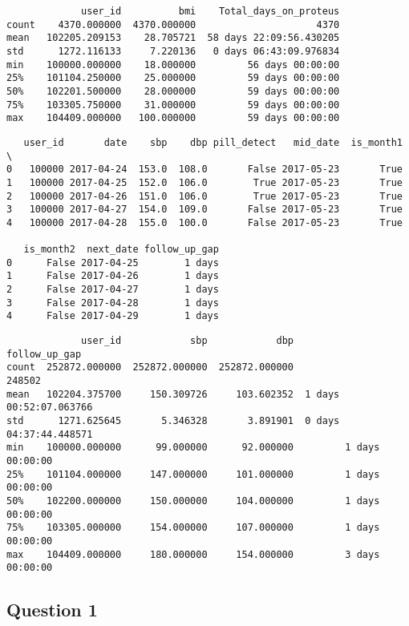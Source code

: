 \documentclass[11pt]{article}
\begin{document}
    
    
    \begin{verbatim}
             user_id          bmi    Total_days_on_proteus
count    4370.000000  4370.000000                     4370
mean   102205.209153    28.705721  58 days 22:09:56.430205
std      1272.116133     7.220136   0 days 06:43:09.976834
min    100000.000000    18.000000         56 days 00:00:00
25%    101104.250000    25.000000         59 days 00:00:00
50%    102201.500000    28.000000         59 days 00:00:00
75%    103305.750000    31.000000         59 days 00:00:00
max    104409.000000   100.000000         59 days 00:00:00
    \end{verbatim}

    
    
    \begin{verbatim}
   user_id       date    sbp    dbp pill_detect   mid_date  is_month1  \
0   100000 2017-04-24  153.0  108.0       False 2017-05-23       True   
1   100000 2017-04-25  152.0  106.0        True 2017-05-23       True   
2   100000 2017-04-26  151.0  106.0        True 2017-05-23       True   
3   100000 2017-04-27  154.0  109.0       False 2017-05-23       True   
4   100000 2017-04-28  155.0  100.0       False 2017-05-23       True   

   is_month2  next_date follow_up_gap  
0      False 2017-04-25        1 days  
1      False 2017-04-26        1 days  
2      False 2017-04-27        1 days  
3      False 2017-04-28        1 days  
4      False 2017-04-29        1 days  
    \end{verbatim}

    
    
    \begin{verbatim}
             user_id            sbp            dbp           follow_up_gap
count  252872.000000  252872.000000  252872.000000                  248502
mean   102204.375700     150.309726     103.602352  1 days 00:52:07.063766
std      1271.625645       5.346328       3.891901  0 days 04:37:44.448571
min    100000.000000      99.000000      92.000000         1 days 00:00:00
25%    101104.000000     147.000000     101.000000         1 days 00:00:00
50%    102200.000000     150.000000     104.000000         1 days 00:00:00
75%    103305.000000     154.000000     107.000000         1 days 00:00:00
max    104409.000000     180.000000     154.000000         3 days 00:00:00
    \end{verbatim}

    
    \hypertarget{question-1}{%
\subsection{Question 1}\label{question-1}}
\end{document}
